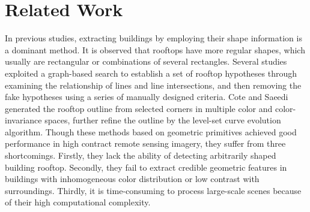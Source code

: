 \section{Related Work}
\label{section:relatedworks}
In previous studies, extracting buildings by employing their shape information is a dominant method. It is observed that rooftops have more regular shapes, which usually are rectangular or combinations of several rectangles. 
Several studies~\cite{noronha2001detection,nosrati2009novel,izadi2012three,wang2015efficient} exploited a graph-based search to establish a set of rooftop hypotheses through examining the relationship of lines and line intersections, and then removing the fake hypotheses using a series of manually designed criteria.
Cote and Saeedi~\cite{cote2013automatic} generated the rooftop outline from selected corners in multiple color and color-invariance spaces, further refine the outline by the level-set curve evolution algorithm. 
Though these methods based on geometric primitives achieved good performance in high contract remote sensing imagery, they suffer from three shortcomings. 
Firstly, they lack the ability of detecting arbitrarily shaped building rooftop. 
Secondly, they fail to  extract credible geometric features in buildings with inhomogeneous color distribution or low contrast with surroundings. 
Thirdly, it is time-consuming to process large-scale scenes because of their high computational complexity.	

